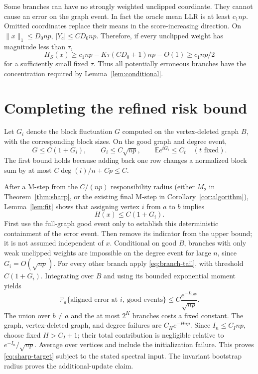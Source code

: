 \documentclass[11pt]{article}
\newcommand{\E}{\mathbb E}
\newcommand{\Prb}{\mathbb P}
\begin{document}
Some branches can have no strongly weighted unclipped coordinate. They cannot cause an error on the graph event. In fact the oracle mean LLR is at least $c_1np$. Omitted coordinates replace their means in the score-increasing direction. On $\|x\|_1\le D_0np$, $|Y_c|\le C D_0np$. Therefore, if every unclipped weight has magnitude less than $\tau$,
\[
 H_S(x)\ge c_1np-K\tau(CD_0+1)np-O(1)\ge c_1np/2
\]
for a sufficiently small fixed $\tau$. Thus all potentially erroneous branches have the concentration required by Lemma~\ref{lem:conditional}.

\section{Completing the refined risk bound}
Let $G_i$ denote the block fluctuation $G$ computed on the vertex-deleted graph $B$, with the corresponding block sizes. On the good graph and degree event,
\[
 G\le C(1+G_i),\qquad G_i\le C\sqrt{np},
 \qquad \E e^{tG_i}\le C_t\quad(t\text{ fixed}).
\]
The first bound holds because adding back one row changes a normalized block sum by at most $C\deg(i)/n+Cp\le C$.

After a M-step from the $C/(np)$ responsibility radius (either $M_2$ in Theorem~\ref{thm:sharp}, or the existing final M-step in Corollary~\ref{cor:algorithm}), Lemma~\ref{lem:fit} shows that assigning vertex $i$ from $a$ to $b$ implies
\[
 H(x)\le C(1+G_i).
\]
First use the full-graph good event only to establish this deterministic containment of the error event. Then remove its indicator from the upper bound; it is not assumed independent of $x$. Conditional on good $B$, branches with only weak unclipped weights are impossible on the degree event for large $n$, since $G_i=O(\sqrt{np})$. For every other branch apply \eqref{eq:branch-tail}, with threshold $C(1+G_i)$. Integrating over $B$ and using its bounded exponential moment yields
\[
 \Prb_a\{\text{aligned error at }i,\ \text{good events}\}
 \le C\frac{e^{-I_{i,ab}}}{\sqrt{np}}.
\]
The union over $b\ne a$ and the at most $2^K$ branches costs a fixed constant. The graph, vertex-deleted graph, and degree failures are $C_H e^{-Hnp}$. Since $I_n\le C_I np$, choose fixed $H>C_I+1$; their total contribution is negligible relative to $e^{-I_n}/\sqrt{np}$. Average over vertices and include the initialization failure. This proves \eqref{eq:sharp-target} subject to the stated spectral input. The invariant bootstrap radius proves the additional-update claim.
\end{document}

